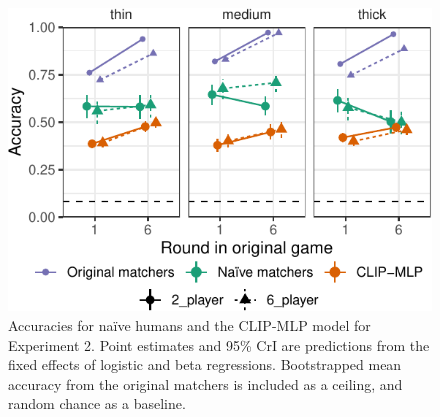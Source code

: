 \documentclass[10pt, letterpaper]{article}
\begin{document}
\begin{CodeChunk}
\begin{figure}[t]

{\centering \includegraphics[width=0.9\linewidth]{figs/fig-condition-1} 

}

\caption[Accuracies for naïve humans and the CLIP-MLP model for Experiment 2]{Accuracies for naïve humans and the CLIP-MLP model for Experiment 2. Point estimates and 95\% CrI are predictions from the fixed effects of logistic and beta regressions. Bootstrapped mean accuracy from the original matchers is included as a ceiling, and random chance as a baseline. \label{expt2-condition}}\label{fig:fig-condition}
\end{figure}
\end{CodeChunk}
\end{document}
